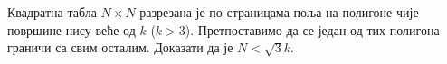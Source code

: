 \problem
Квадратна табла $N \times N$ разрезана је по страницама поља на полигоне чије
површине нису веће од $k$ ($k > 3$).
Претпоставимо да се један од тих полигона граничи са свим осталим.
Доказати да је $N<\sqrt{3} k$. 

\solution

\endproblem
